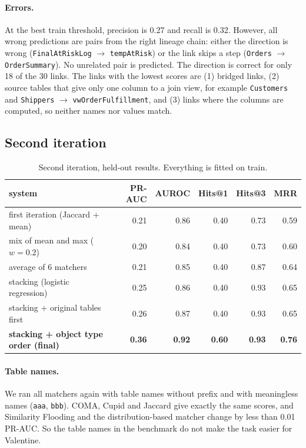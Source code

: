 \documentclass[11pt,a4paper]{article}
\begin{document}
\paragraph{Errors.} At the best train threshold, precision is 0.27 and recall is 0.32. However, all wrong
predictions are pairs from the right lineage chain: either the direction is wrong (\texttt{FinalAtRiskLog}
$\rightarrow$ \texttt{tempAtRisk}) or the link skips a step (\texttt{Orders} $\rightarrow$ \texttt{OrderSummary}).
No unrelated pair is predicted. The direction is correct for only 18 of the 30 links. The links with the lowest
scores are (1) bridged links, (2) source tables that give only one column to a join view, for example
\texttt{Customers} and \texttt{Shippers} $\rightarrow$ \texttt{vwOrderFulfillment}, and (3) links where the columns
are computed, so neither names nor values match.

\subsection{Second iteration}\label{sec:res-second}

\begin{table}[htbp]
\centering\small
\caption{Second iteration, held-out results. Everything is fitted on train.}
\label{tab:second}
\begin{tabular}{lrrrrr}
\toprule
system & PR-AUC & AUROC & Hits@1 & Hits@3 & MRR \\
\midrule
first iteration (Jaccard + mean) & 0.21 & 0.86 & 0.40 & 0.73 & 0.59 \\
mix of mean and max ($w = 0.2$) & 0.20 & 0.84 & 0.40 & 0.73 & 0.60 \\
average of 6 matchers & 0.21 & 0.85 & 0.40 & 0.87 & 0.64 \\
stacking (logistic regression) & 0.25 & 0.86 & 0.40 & 0.93 & 0.65 \\
stacking + original tables first & 0.26 & 0.87 & 0.40 & 0.93 & 0.65 \\
\textbf{stacking + object type order (final)} & \textbf{0.36} & \textbf{0.92} & \textbf{0.60} & \textbf{0.93} & \textbf{0.76} \\
\bottomrule
\end{tabular}
\end{table}

\paragraph{Table names.} We ran all matchers again with table names without prefix and with meaningless names
(\texttt{aaa}, \texttt{bbb}). COMA, Cupid and Jaccard give exactly the same scores, and Similarity Flooding and the
distribution-based matcher change by less than 0.01 PR-AUC. So the table names in the benchmark do not make the task
easier for Valentine.
\end{document}
